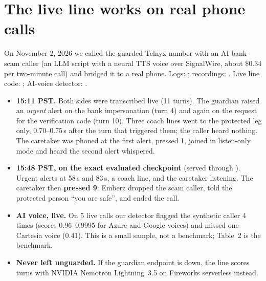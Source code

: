 \documentclass[11pt]{article}
\begin{document}
\section{The live line works on real phone calls}
On November 2, 2026 we called the guarded Telnyx number with an AI bank-scam caller (an LLM script with a neural TTS voice over SignalWire, about \$0.34 per two-minute call) and bridged it to a real phone. Logs: ; recordings: . Live line code: ; AI-voice detector: .
\begin{itemize}
\item \textbf{15:11 PST.} Both sides were transcribed live (11 turns). The guardian raised an \emph{urgent} alert on the bank impersonation (turn 4) and again on the request for the verification code (turn 10). Three coach lines went to the protected leg only, 0.70--0.75\,s after the turn that triggered them; the caller heard nothing. The caretaker was phoned at the first alert, pressed 1, joined in listen-only mode and heard the second alert whispered.
\item \textbf{15:48 PST, on the exact evaluated checkpoint} (served through ). Urgent alerts at 58\,s and 83\,s, a coach line, and the caretaker listening. The caretaker then \textbf{pressed 9}: Emberz dropped the scam caller, told the protected person ``you are safe'', and ended the call.
\item \textbf{AI voice, live.} On 5 live calls our detector flagged the synthetic caller 4 times (scores 0.96--0.9995 for Azure and Google voices) and missed one Cartesia voice (0.41). This is a small sample, not a benchmark; Table~2 is the benchmark.
\item \textbf{Never left unguarded.} If the guardian endpoint is down, the line scores turns with NVIDIA Nemotron Lightning~3.5 on Fireworks serverless instead.
\end{itemize}
\end{document}
